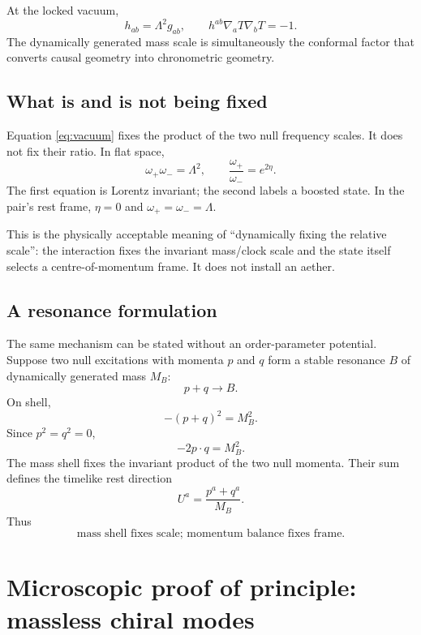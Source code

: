 \documentclass[11pt,a4paper]{article}
\begin{document}
At the locked vacuum,
\begin{equation}
\boxed{
h_{ab}=\Lambda^2g_{ab},
\qquad
h^{ab}\nabla_aT\nabla_bT=-1.
}
\label{eq:lockedmetric}
\end{equation}
The dynamically generated mass scale is simultaneously the conformal factor that converts causal geometry into chronometric geometry.

\subsection{What is and is not being fixed}

Equation \eqref{eq:vacuum} fixes the product of the two null frequency scales. It does not fix their ratio. In flat space,
\[
\omega_+\omega_-=\Lambda^2,
\qquad
\frac{\omega_+}{\omega_-}=e^{2\eta}.
\]
The first equation is Lorentz invariant; the second labels a boosted state. In the pair's rest frame, $\eta=0$ and $\omega_+=\omega_-=\Lambda$.

This is the physically acceptable meaning of ``dynamically fixing the relative scale'': the interaction fixes the invariant mass/clock scale and the state itself selects a centre-of-momentum frame. It does not install an aether.

\subsection{A resonance formulation}

The same mechanism can be stated without an order-parameter potential. Suppose two null excitations with momenta $p$ and $q$ form a stable resonance $B$ of dynamically generated mass $M_B$:
\[
p+q\longrightarrow B.
\]
On shell,
\begin{equation}
-(p+q)^2=M_B^2.
\end{equation}
Since $p^2=q^2=0$,
\begin{equation}
\boxed{-2p\cdot q=M_B^2.}
\label{eq:massshelllock}
\end{equation}
The mass shell fixes the invariant product of the two null momenta. Their sum defines the timelike rest direction
\[
U^a=\frac{p^a+q^a}{M_B}.
\]
Thus
\[
\boxed{
\text{mass shell fixes scale; momentum balance fixes frame.}
}
\]

\section{Microscopic proof of principle: massless chiral modes}
\end{document}
